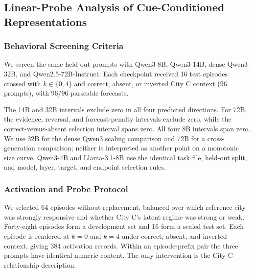 \subsection{Linear-Probe Analysis of Cue-Conditioned Representations}
\label{app:coin-city-mechanistic-probe}

\subsubsection{Behavioral Screening Criteria}
We screen the same held-out prompts with Qwen3-8B, Qwen3-14B, dense Qwen3-32B, and
Qwen2.5-72B-Instruct. Each checkpoint received 16 test episodes crossed with
$k\in\{0,4\}$ and correct, absent, or inverted City C context (96 prompts), with
96/96 parseable forecasts.

\begin{center}
\begin{minipage}{\linewidth}
\centering
{}
\label{tab:coin-city-behavioral-gate}
\scriptsize
\setlength{\tabcolsep}{2.4pt}
\resizebox{\linewidth}{!}{}
\end{minipage}
\end{center}

The 14B and 32B intervals exclude zero in all four predicted directions. For 72B,
the evidence, reversal, and forecast-penalty intervals exclude zero, while the
correct-versus-absent selection interval spans zero. All four 8B intervals span
zero. We use 32B for the dense Qwen3 scaling comparison and 72B for a
cross-generation comparison; neither is interpreted as another point on a
monotonic size curve. Qwen3-4B and Llama-3.1-8B use the identical task file,
held-out split, and model, layer, target, and endpoint selection rules.

\subsubsection{Activation and Probe Protocol}
We selected 64 episodes without replacement, balanced over which reference city
was strongly responsive and whether City C's latent regime was strong or weak.
Forty-eight episodes form a development set and 16 form a sealed test set. Each
episode is rendered at $k=0$ and $k=4$ under correct, absent, and inverted context,
giving 384 activation records. Within an episode-prefix pair the three prompts
have identical numeric content. The only intervention is the City C relationship
description.


